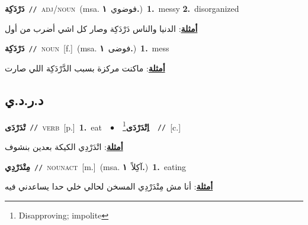 \documentclass[10pt,a4paper,twoside]{article} %
\begin{document}
\begin{multicols}{2}
{\setlength\topsep{0pt}\textbf{\foreignlanguage{arabic}{دَرْدَكِة}}\ {\color{gray}\texttt{//}\color{black}}\ \textsc{adj/noun}\ \color{gray}(msa. \foreignlanguage{arabic}{فوضوي}~\foreignlanguage{arabic}{\textbf{١.}})\color{black}\ \textbf{1.}~messy  \textbf{2.}~disorganized\  \begin{flushright}\color{gray}\foreignlanguage{arabic}{\textbf{\underline{\foreignlanguage{arabic}{أمثلة}}}: الدنيا والناس دَرْدَكِة وصار كل اشي أضرب من أول}\end{flushright}\color{black}} \vspace{2mm}

{\setlength\topsep{0pt}\textbf{\foreignlanguage{arabic}{دَرْدَكِة}}\ {\color{gray}\texttt{//}\color{black}}\ \textsc{noun}\ [f.]\ \color{gray}(msa. \foreignlanguage{arabic}{فوضى}~\foreignlanguage{arabic}{\textbf{١.}})\color{black}\ \textbf{1.}~mess\  \begin{flushright}\color{gray}\foreignlanguage{arabic}{\textbf{\underline{\foreignlanguage{arabic}{أمثلة}}}: ماكنت مركزة بسبب الدَّرْدَكِة اللي صارت}\end{flushright}\color{black}} \vspace{2mm}

\vspace{-3mm}
\subsection*{\color{blue}\foreignlanguage{arabic}{د.ر.د.ي}\color{blue}{}} 

{\setlength\topsep{0pt}\textbf{\foreignlanguage{arabic}{تْدَرْدَى}}\ {\color{gray}\texttt{//}\color{black}}\ \textsc{verb}\ [p.]\ \textbf{1.}~eat\ \ $\bullet$\ \ \setlength\topsep{0pt}\textbf{\foreignlanguage{arabic}{اِتْدَرْدَى}}\footnote{Disapproving; impolite}\ \ {\color{gray}\texttt{//}\color{black}}\ [c.]\  \begin{flushright}\color{gray}\foreignlanguage{arabic}{\textbf{\underline{\foreignlanguage{arabic}{أمثلة}}}: اتْدَرْدِي الكيكة بعدين بنشوف}\end{flushright}\color{black}} \vspace{2mm}

{\setlength\topsep{0pt}\textbf{\foreignlanguage{arabic}{مِتْدَرْدِي}}\ {\color{gray}\texttt{//}\color{black}}\ \textsc{noun\textunderscore act}\ [m.]\ \color{gray}(msa. \foreignlanguage{arabic}{آكِلاً}~\foreignlanguage{arabic}{\textbf{١.}})\color{black}\ \textbf{1.}~eating\  \begin{flushright}\color{gray}\foreignlanguage{arabic}{\textbf{\underline{\foreignlanguage{arabic}{أمثلة}}}: أنا مش مِتْدَرْدِي المسخن لحالي خلي حدا يساعدني فيه}\end{flushright}\color{black}} \vspace{2mm}


\end{multicols}
\end{document}

